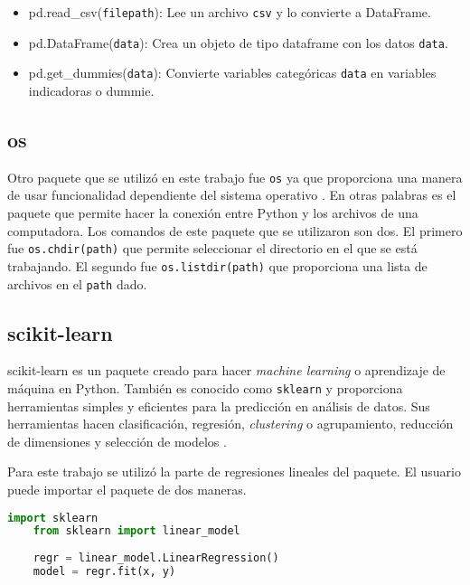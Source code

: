 \begin{itemize}
	\item pd.read\_csv(\texttt{filepath}): Lee un archivo \texttt{csv} y lo convierte a DataFrame.
	
	\item pd.DataFrame(\texttt{data}): Crea un objeto de tipo dataframe con los datos \texttt{data}. 
	
	\item pd.get\_dummies(\texttt{data}): Convierte variables categóricas \texttt{data} en variables indicadoras o dummie. 
\end{itemize}

\subsection{os}
Otro paquete que se utilizó en este trabajo fue \texttt{os} ya que proporciona una manera de usar funcionalidad dependiente del sistema operativo \cite{doc_python} . En otras palabras es el paquete que permite hacer la conexión entre \textsf{Python} y los archivos de una computadora. Los comandos de este paquete que se utilizaron son dos. El primero fue \texttt{os.chdir(path)} que permite seleccionar el directorio en el que se está trabajando. El segundo fue \texttt{os.listdir(path)} que proporciona una lista de archivos en el \texttt{path} dado. 


\subsection{scikit-learn}
scikit-learn es un paquete creado para hacer \textit{machine learning} o aprendizaje de máquina en \textsf{Python}. También es conocido como \texttt{sklearn} y proporciona herramientas simples y eficientes para la predicción en análisis de datos. Sus herramientas hacen clasificación, regresión, \textit{clustering} o agrupamiento, reducción de dimensiones y selección de modelos \cite{doc_python}.

Para este trabajo se utilizó la parte de regresiones lineales del paquete. El usuario puede importar el paquete  de dos maneras. 

\begin{lstlisting}[language=Python]
	import sklearn
	from sklearn import linear_model
	
	regr = linear_model.LinearRegression()
	model = regr.fit(x, y)
\end{lstlisting}

